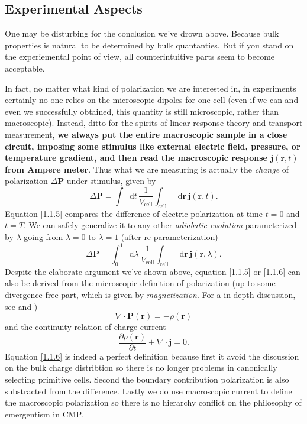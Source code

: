 \documentclass[10pt,nofootinbib]{revtex4}
\newcommand*\dd{\mathop{}\!\mathrm{d}}
\begin{document}
	\subsection{Experimental Aspects}
		One may be disturbing for the conclusion we've drown above. Because bulk properties is natural to be determined by bulk quantanties. But if you stand on the experiemental point of view, all counterintuitive parts seem to become acceptable.\par
		In fact, no matter what kind of polarization we are interested in, in experiments certainly no one relies on the microscopic dipoles for one cell (even if we can and even we successfully obtained, this quantity is still microscopic, rather than macroscopic). Instead, ditto for the spirits of linear-response theory and transport measurement, \textbf{we always put the entire macroscopic sample in a close circuit, imposing some stimulus like external electric field, pressure, or temperature gradient, and then read the macroscopic response $\bm{j}(\bm{r},t)$ from Ampere meter}. Thus what we are measuring is actually the \emph{change} of polarization $\Delta\bm{P}$ under stimulus, given by
		\begin{equation}\label{1.1.5}
			\Delta\bm{P}=\int\dd t\,\dfrac{1}{V_{\text{cell}}}\int_{\text{cell}}\dd\bm{r}\,\bm{j}(\bm{r},t).
		\end{equation}
		Equation \eqref{1.1.5} compares the difference of electric polarization at time $t=0$ and $t=T$. We can safely generalize it to any other \emph{adiabatic evolution} parameterized by $\lambda$ going from $\lambda=0$ to $\lambda=1$ (after re-parameterization)
		\begin{equation}\label{1.1.6}
			\Delta\bm{P}=\int_0^1\dd \lambda\,\dfrac{1}{V_{\text{cell}}}\int_{\text{cell}}\dd\bm{r}\,\bm{j}(\bm{r},\lambda).
		\end{equation}
		Despite the elaborate argument we've shown above, equation \eqref{1.1.5} or \eqref{1.1.6} can also be derived from the microscopic definition of polarization (up to some divergence-free part, which is given by \emph{magnetization}. For a in-depth discussion, see \cite{xiao2010berry,ortiz1994macroscopic} and \cite{hirst1997microscopic})
		\begin{equation*}
			\nabla\cdot\bm{P}(\bm{r})=-\rho(\bm{r})
		\end{equation*}
		and the continuity relation of charge current
		\begin{equation*}
			\dfrac{\partial \rho(\bm{r})}{\partial t}+\nabla\cdot\bm{j}=0.
		\end{equation*}
		\indent Equation \eqref{1.1.6} is indeed a perfect definition because first it avoid the discussion on the bulk charge distribtion so there is no longer problems in canonically selecting primitive cells. Second the boundary contribution polarization is also substracted from the difference. Lastly we do use macroscopic current to define the macroscopic polarization so there is no hierarchy conflict on the philosophy of emergentism in CMP.\par
		
\end{document}
